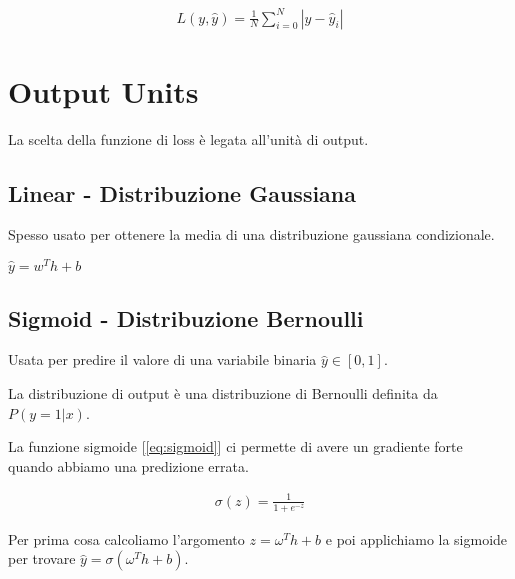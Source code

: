 \begin{align*}
  L(y, \hat{y}) = \frac{1}{N} \sum_{i = 0}^N {|y - \hat{y}_i|}
\end{align*}

\section{Output Units}
La scelta della funzione di loss è legata all'unità di output.

\subsection{Linear - Distribuzione Gaussiana}
Spesso usato per ottenere la media di una distribuzione gaussiana condizionale.

$\hat{y} = w^T h + b$

\subsection{Sigmoid - Distribuzione Bernoulli}
Usata per predire il valore di una variabile binaria $\hat{y} \in [0, 1]$.

La distribuzione di output è una distribuzione di Bernoulli definita da $P(y = 1 | x)$.

La funzione sigmoide [\ref{eq:sigmoid}] ci permette di avere un gradiente forte quando abbiamo una predizione errata.

\begin{minipage}{0.6\linewidth}
\end{minipage}
%
\begin{minipage}{0.3\linewidth}
  \begin{align}
    \sigma(z) = \frac{1}{1 + e^{-z}}
    \label{eq:sigmoid}
  \end{align}
\end{minipage}

Per prima cosa calcoliamo l'argomento $z = \omega^T h + b$ e poi applichiamo la sigmoide per trovare $\hat{y} = \sigma(\omega^T h + b)$.

